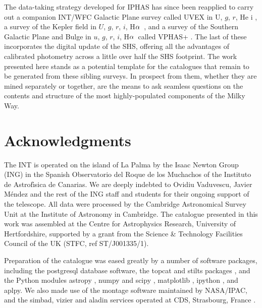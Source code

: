 \documentclass[a4paper,useAMS,usenatbib]{mn2e}
\def\ha{\mbox{H$\rm \alpha$}}
\begin{document}
The data-taking strategy developed for IPHAS
has since been reapplied to carry out 
a companion INT/WFC Galactic Plane survey called UVEX
in U, $g$, $r$, He {\sc i} \citep{Groot2009},
a survey of the Kepler field 
in $U$, $g$, $r$, $i$, \ha\ 
\citep{Greiss2012},
and a survey of the Southern Galactic Plane and Bulge
in $u$, $g$, $r$, $i$, \ha\ 
called VPHAS+ \citep{Drew2014}.  The last of these incorporates the
digital update of the SHS, offering all the advantages of calibrated
photometry across a little over half the SHS footprint.  
The work presented here
stands as a potential template for the catalogues that
remain to be generated from these sibling surveys.  
In prospect from them, whether they are mined separately or together,
are the means to ask seamless questions on the contents and structure of 
the most highly-populated components of the Milky Way.  

\section*{Acknowledgments}

The INT is operated on the island of La Palma
by the Isaac Newton Group (ING)
in the Spanish Observatorio del Roque de los Muchachos
of the Instituto de Astrof\'\i sica de Canarias.
We are deeply indebted to Ovidiu Vaduvescu,
Javier M\'endez and the rest of the ING staff and students
for their ongoing support of the telescope.
All data were processed 
by the Cambridge Astronomical Survey Unit
at the Institute of Astronomy in Cambridge.
The catalogue presented in this work was assembled
at the Centre for Astrophysics Research, University of Hertfordshire, supported by a grant from the Science \& Technology Facilities Council
of the UK (STFC, ref ST/J001335/1).

Preparation of the catalogue was eased greatly
by a number of software packages,
including the {\sc postgresql} database software,
the {\sc topcat} and {\sc stilts} packages \citep{Taylor2005,Taylor2006},
and the Python modules
{\sc astropy} \citep{Astropy},
{\sc numpy} and {\sc scipy} \citep{Numpy},
{\sc matplotlib} \citep{Matplotlib},
{\sc ipython} \citep{IPython},
and {\sc aplpy}.
We also made use of the {\sc montage} software maintained by NASA/IPAC,
and the {\sc simbad}, {\sc vizier} and {\sc aladin} services
operated at CDS, Strasbourg, France \citep{Aladin}.
\end{document}
